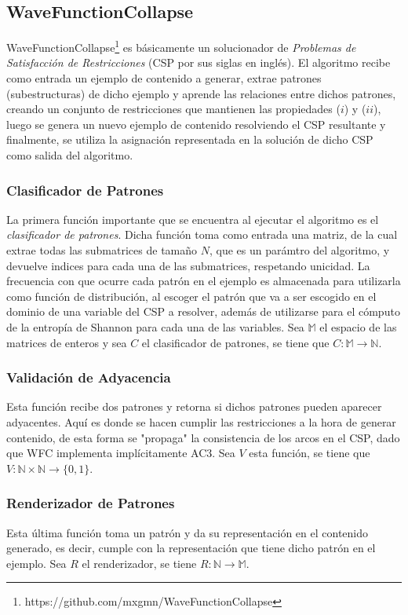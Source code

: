 \documentclass[a4paper, 10pt]{article}
\begin{document}
	\subsection{WaveFunctionCollapse}
	WaveFunctionCollapse\footnote{https://github.com/mxgmn/WaveFunctionCollapse}
	es básicamente un solucionador de 
	\textit{Problemas de Satisfacción de Restricciones}\cite{bib:2} (CSP por sus siglas en inglés).
	El algoritmo recibe como entrada un ejemplo de contenido a generar, extrae patrones (subestructuras)
	de dicho ejemplo y aprende las relaciones entre dichos patrones, creando un conjunto
	de restricciones que mantienen las propiedades ($i$) y ($ii$), luego se genera
	un nuevo ejemplo de contenido resolviendo el CSP resultante y finalmente, se utiliza la
	asignación representada en la solución de dicho CSP como salida del algoritmo.

	\subsubsection{Clasificador de Patrones}
	La primera función importante que se encuentra al ejecutar el algoritmo es
	el \textit{clasificador de patrones}. Dicha función toma como entrada una matriz,
	de la cual extrae todas las submatrices de tamaño $N$, que es un parámtro del
	algoritmo, y devuelve indices para cada una de las submatrices, respetando unicidad. 
	La frecuencia con que ocurre cada patrón en el ejemplo es almacenada
	para utilizarla como función de distribución, al escoger el patrón que va a ser escogido
	en el dominio de una variable del CSP a resolver, además de utilizarse para el cómputo
	de la entropía de Shannon para cada una de las variables.
	Sea $\mathbb{M}$ el espacio de las matrices de enteros y sea $C$ el clasificador de 
	patrones, se tiene que $C:\mathbb{M} \rightarrow \mathbb{N}$. 

	\subsubsection{Validación de Adyacencia}
	Esta función recibe dos patrones y retorna si dichos patrones pueden aparecer
	adyacentes. Aquí es donde se hacen cumplir las restricciones a la hora de
	generar contenido, de esta forma se "propaga" la consistencia de los arcos
	en el CSP, dado que WFC implementa implícitamente AC3\cite{bib:2}.
	Sea $V$ esta función, se tiene que $V:\mathbb{N}\times\mathbb{N} \rightarrow \{0, 1\}$.

	\subsubsection{Renderizador de Patrones}
	Esta última función toma un patrón y da su representación en el contenido generado,
	es decir, cumple con la representación que tiene dicho patrón en el ejemplo.
	Sea $R$ el renderizador, se tiene $R:\mathbb{N} \rightarrow \mathbb{M}$.
\end{document}
